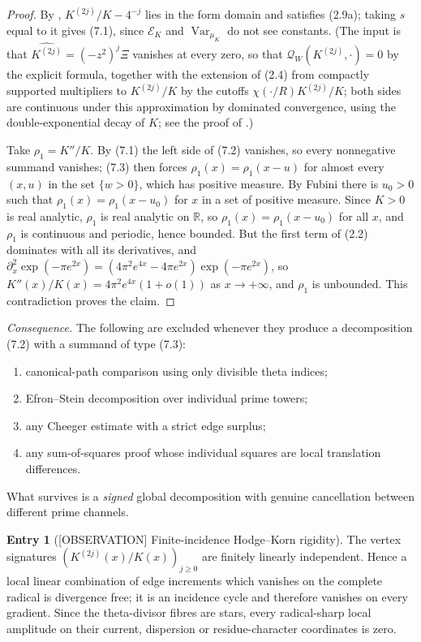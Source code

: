 \documentclass[11pt]{amsart}
\theoremstyle{definition}
\newcounter{family}
\newtheorem{entry}{Entry}[family]
\theoremstyle{remark}
\newcommand{\R}{\mathbb R}
\newcommand{\QW}{\mathcal Q_W}
\newcommand{\XiR}{\Xi}
\newcommand{\EK}{\mathscr E_K}
\DeclareMathOperator{\Var}{Var}
\newcommand{\OBS}{\textup{[OBSERVATION]}}
\begin{document}
\begin{proof}
By \cite[Proposition~23.3]{TrejoPizzo39}, \(K^{(2j)}/K-4^{-j}\) lies in
the form domain and satisfies (2.9a); taking \(s\) equal to it gives
(7.1), since \(\EK\) and \(\Var_{\mu_K}\) do not see constants.  (The
input is that \(\widehat{K^{(2j)}}=(-z^2)^j\XiR\) vanishes at every zero,
so that \(\QW(K^{(2j)},\cdot)=0\) by the explicit formula, together with
the extension of (2.4) from compactly supported multipliers to
\(K^{(2j)}/K\) by the cutoffs \(\chi(\cdot/R)K^{(2j)}/K\); both sides are
continuous under this approximation by dominated convergence, using the
double-exponential decay of \(K\); see the proof of
\cite[Proposition~23.3]{TrejoPizzo39}.)

Take \(\rho_1=K''/K\).  By (7.1) the left side of (7.2) vanishes, so every
nonnegative summand vanishes; (7.3) then forces \(\rho_1(x)=\rho_1(x-u)\) for
almost every \((x,u)\) in the set \(\{w>0\}\), which has positive
measure.  By Fubini there is \(u_0>0\) such that \(\rho_1(x)=\rho_1(x-u_0)\) for
\(x\) in a set of positive measure.  Since \(K>0\) is real analytic,
\(\rho_1\) is real analytic on \(\R\), so \(\rho_1(x)=\rho_1(x-u_0)\) for all
\(x\), and \(\rho_1\) is continuous and periodic, hence bounded.  But the
first term of (2.2) dominates with all its derivatives, and
\(\partial_x^2\exp(-\pi e^{2x})=(4\pi^2e^{4x}-4\pi e^{2x})\exp(-\pi e^{2x})\),
so \(K''(x)/K(x)=4\pi^2e^{4x}(1+o(1))\) as \(x\to+\infty\), and \(\rho_1\) is
unbounded.  This contradiction proves the claim.
\end{proof}

\emph{Consequence.} The following are excluded whenever they produce a
decomposition (7.2) with a summand of type (7.3):
\begin{enumerate}
\item canonical-path comparison using only divisible theta indices;
\item Efron--Stein decomposition over individual prime towers;
\item any Cheeger estimate with a strict edge surplus;
\item any sum-of-squares proof whose individual squares are local
 translation differences.
\end{enumerate}
What survives is a \emph{signed} global decomposition with genuine
cancellation between different prime channels.

\begin{entry}[\OBS{} Finite-incidence Hodge--Korn rigidity]
\label{ent:C2}
The vertex signatures \((K^{(2j)}(x)/K(x))_{j\ge0}\) are finitely linearly
independent.  Hence a local linear combination of edge increments which
vanishes on the complete radical is divergence free; it is an incidence
cycle and therefore vanishes on every gradient.  Since the theta-divisor
fibres are stars, every radical-sharp local amplitude on their current,
dispersion or residue-character coordinates is zero.
\end{entry}
\end{document}
